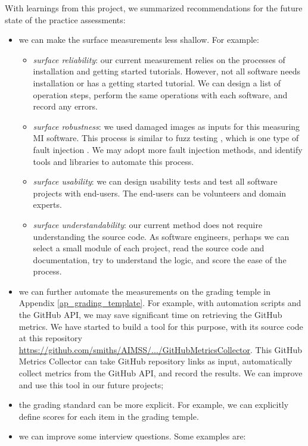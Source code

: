 With learnings from this project, we summarized recommendations for the future state of the practice assessments:
\begin{itemize}
    \item we can make the surface measurements less shallow. For example:
    \begin{itemize}
        \item \textit{surface reliability}: our current measurement relies on the processes of installation and getting started tutorials. However, not all software needs installation or has a getting started tutorial. We can design a list of operation steps, perform the same operations with each software, and record any errors.
        \item \textit{surface robustness}: we used damaged images as inputs for this measuring MI software. This process is similar to fuzz testing \cite{enwiki:1039424308}, which is one type of fault injection \cite{enwiki:1039005082}. We may adopt more fault injection methods, and identify tools and libraries to automate this process.
        \item \textit{surface usability}: we can design usability tests and test all software projects with end-users. The end-users can be volunteers and domain experts.
        \item \textit{surface understandability}: our current method does not require understanding the source code. As software engineers, perhaps we can select a small module of each project, read the source code and documentation, try to understand the logic, and score the ease of the process.
    \end{itemize}
	\item we can further automate the measurements on the grading temple in Appendix \ref{ap_grading_template}. For example, with automation scripts and the GitHub API, we may save significant time on retrieving the GitHub metrics. We have started to build a tool for this purpose, with its source code at this repository \hyperlink{https://github.com/smiths/AIMSS/tree/master/StateOfPractice/GitHubMetricsCollector}{https://github.com/smiths/AIMSS/.../GitHubMetricsCollector}. This GitHub Metrics Collector can take GitHub repository links as input, automatically collect metrics from the GitHub API, and record the results. We can improve and use this tool in our future projects;
	\item the grading standard can be more explicit. For example, we can explicitly define scores for each item in the grading temple.
	\item we can improve some interview questions. Some examples are:

\end{itemize}
